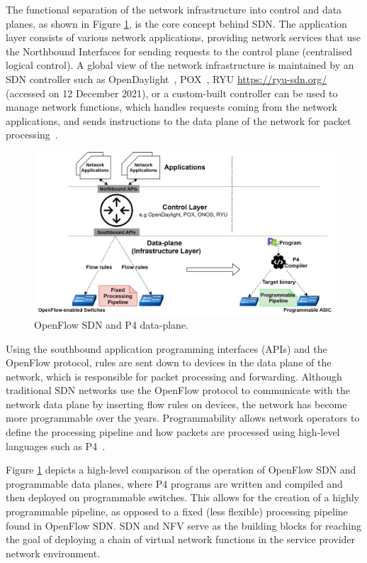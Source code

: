 \documentclass[futureinternet,review,accept,pdftex,moreauthors]{Definitions/mdpi}
\begin{document}
The functional separation of the network infrastructure into control and data planes, as shown in Figure \ref{SDNseparation}, is the core concept behind SDN. The application layer consists of various network applications, providing network services that use the Northbound Interfaces for sending requests to the control plane (centralised logical control). A global view of the network infrastructure is maintained by an SDN controller such as OpenDaylight~\cite{medved2014opendaylight}, POX~\cite{kaur2014network}, RYU 
{\url{https://ryu-sdn.org/}}  ({accessed} %
on 12 December 2021), or a custom-built controller can be used to manage network functions, which handles requests coming from the network applications, and sends instructions to the data plane of the network for packet processing~\cite{zhang2021performance}.
\begin{figure}[H]%
\includegraphics[width=.99\textwidth]{SDNseparation.pdf}
\caption{OpenFlow SDN and P4 data-plane.}
\label{SDNseparation}
\end{figure}
Using the southbound application programming interfaces (APIs) and the OpenFlow protocol, rules are sent down to devices in the data plane of the network, which is responsible for packet processing and forwarding. Although traditional SDN networks  use the OpenFlow protocol to communicate with the network data plane by inserting flow rules on devices, the network has become more programmable over the years. Programmability allows network operators to define the processing pipeline and how packets are processed using high-level languages such as P4~\cite{bosshart2014p4}.

Figure \ref{SDNseparation} depicts a high-level comparison of the operation of OpenFlow SDN and programmable data planes, where P4 programs are written and compiled and then deployed on programmable switches. This allows for the creation of a highly programmable pipeline, as opposed to a fixed (less flexible) processing pipeline found in OpenFlow SDN. SDN and NFV serve as the building blocks for reaching the goal of deploying a chain of virtual network functions in the service provider network environment.
\end{document}
